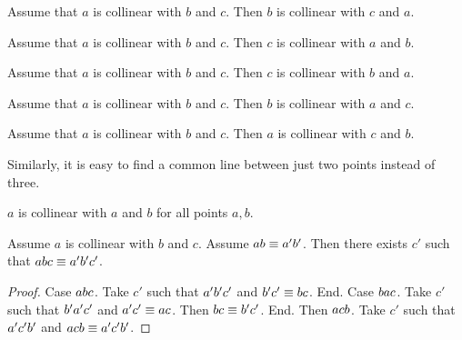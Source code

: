\documentclass[10pt,a4paper,parskip=half,numbers=endperiod,parskip]{scrartcl}
\begin{document}
  \begin{forthel}
    \begin{lemma}
      Assume that $a$ is collinear with $b$ and $c$.
      Then $b$ is collinear with $c$ and $a$.
    \end{lemma}

    \begin{lemma}
      Assume that $a$ is collinear with $b$ and $c$.
      Then $c$ is collinear with $a$ and $b$.
    \end{lemma}

    \begin{lemma}
      Assume that $a$ is collinear with $b$ and $c$.
      Then $c$ is collinear with $b$ and $a$.
    \end{lemma}

    \begin{lemma}
      Assume that $a$ is collinear with $b$ and $c$.
      Then $b$ is collinear with $a$ and $c$.
    \end{lemma}

    \begin{lemma}
      Assume that $a$ is collinear with $b$ and $c$.
      Then $a$ is collinear with $c$ and $b$.
    \end{lemma}
  \end{forthel}

  Similarly, it is easy to find a common line between just two points instead of three.

  \begin{forthel}
    \begin{lemma} %
      $a$ is collinear with $a$ and $b$ for all points $a, b$.
    \end{lemma}

    \begin{lemma} %
      Assume $a$ is collinear with $b$ and $c$.
      Assume $a b \equiv a' b'$.
      Then there exists $c'$ such that $a b c \equiv a' b' c'$.
    \end{lemma}
    \begin{proof}
      Case $a b c$.
      Take $c'$ such that $a' b' c'$ and $b' c' \equiv b c$.
      End.
      Case $b a c$.
      Take $c'$ such that $b' a' c'$ and $a' c' \equiv a c$.
      Then $b c \equiv b' c'$.
      End.
      Then $a c b$.
      Take $c'$ such that $a' c' b'$ and $a c b \equiv a' c' b'$.
    \end{proof}
  \end{forthel}
\end{document}
